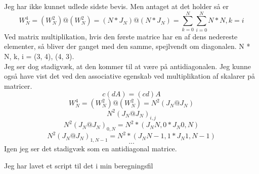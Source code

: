 \begin{Opgaver}
\begin{kapitel}
\begin{Opgave}
\begin{UnderOpgave}
            \end{UnderOpgave}
            \begin{UnderOpgave}[Show that \text{$W_N^4, = N^2I_N$}. Explain the implication of this result.]
                Jeg har ikke kunnet udlede sidste bevis. Men antaget at det holder så er
                \[W_N^4 = (W_N^2)@(W_N^2) = (N*J_N) @ (N*J_N) = \sum_{k = 0}^{N} \sum_{i = 0}^{N} N * N, k = i \]
                Ved matrix multiplikation, hvis den første matrice har en af dens nedereste elementer, så bliver der ganget med den samme, spejlvendt om diagonalen. 
                N * N, k, i = (3, 4), (4, 3). \\
                Jeg ser dog stadigvæk, at den kommer til at være på antidiagonalen. 
                Jeg kunne også have vist det ved den associative egenskab ved multiplikation af skalarer på matricer. 
                \[c(dA) = (cd)A\]
                \[W_N^4 = (W_N^2)@(W_N^2) = N^2(J_N @ J_N)\]
                \[N^2(J_N @ J_N)_{i, j}\] 
                \[N^2(J_N @ J_N)_{0, N} = N^2*(J_N{N, 0} * J_N{0, N})\]
                \[N^2(J_N @ J_N)_{1, N - 1} = N^2*(J_N{N - 1, 1} * J_N{1, N - 1})\]
                \[...\]
                Igen jeg ser det stadigvæk som en antidiagonal matrice. 

            \end{UnderOpgave}
            \begin{UnderOpgave}
                Jeg har lavet et script til det i min beregningsfil 
                

\end{UnderOpgave}
\end{Opgave}
\end{kapitel}
\end{Opgaver}
